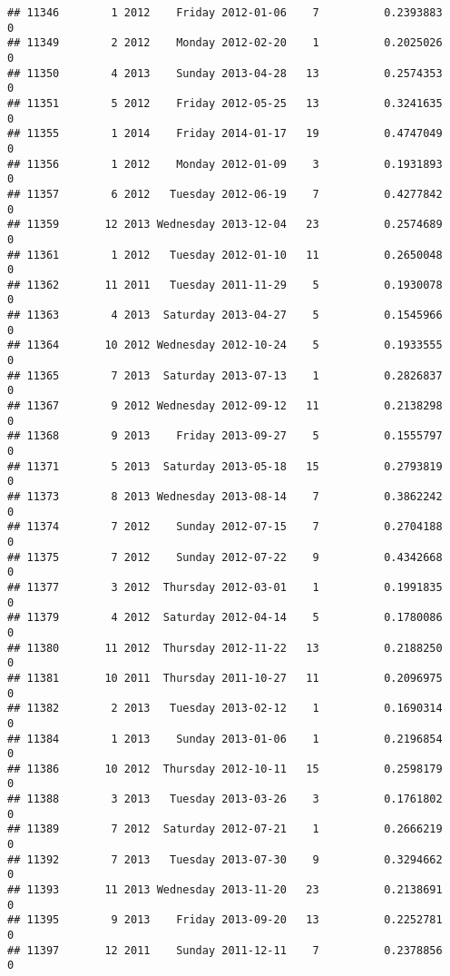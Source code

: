 \documentclass[
]{article}
\begin{document}
\begin{verbatim}
## 11346        1 2012    Friday 2012-01-06    7          0.2393883             0
## 11349        2 2012    Monday 2012-02-20    1          0.2025026             0
## 11350        4 2013    Sunday 2013-04-28   13          0.2574353             0
## 11351        5 2012    Friday 2012-05-25   13          0.3241635             0
## 11355        1 2014    Friday 2014-01-17   19          0.4747049             0
## 11356        1 2012    Monday 2012-01-09    3          0.1931893             0
## 11357        6 2012   Tuesday 2012-06-19    7          0.4277842             0
## 11359       12 2013 Wednesday 2013-12-04   23          0.2574689             0
## 11361        1 2012   Tuesday 2012-01-10   11          0.2650048             0
## 11362       11 2011   Tuesday 2011-11-29    5          0.1930078             0
## 11363        4 2013  Saturday 2013-04-27    5          0.1545966             0
## 11364       10 2012 Wednesday 2012-10-24    5          0.1933555             0
## 11365        7 2013  Saturday 2013-07-13    1          0.2826837             0
## 11367        9 2012 Wednesday 2012-09-12   11          0.2138298             0
## 11368        9 2013    Friday 2013-09-27    5          0.1555797             0
## 11371        5 2013  Saturday 2013-05-18   15          0.2793819             0
## 11373        8 2013 Wednesday 2013-08-14    7          0.3862242             0
## 11374        7 2012    Sunday 2012-07-15    7          0.2704188             0
## 11375        7 2012    Sunday 2012-07-22    9          0.4342668             0
## 11377        3 2012  Thursday 2012-03-01    1          0.1991835             0
## 11379        4 2012  Saturday 2012-04-14    5          0.1780086             0
## 11380       11 2012  Thursday 2012-11-22   13          0.2188250             0
## 11381       10 2011  Thursday 2011-10-27   11          0.2096975             0
## 11382        2 2013   Tuesday 2013-02-12    1          0.1690314             0
## 11384        1 2013    Sunday 2013-01-06    1          0.2196854             0
## 11386       10 2012  Thursday 2012-10-11   15          0.2598179             0
## 11388        3 2013   Tuesday 2013-03-26    3          0.1761802             0
## 11389        7 2012  Saturday 2012-07-21    1          0.2666219             0
## 11392        7 2013   Tuesday 2013-07-30    9          0.3294662             0
## 11393       11 2013 Wednesday 2013-11-20   23          0.2138691             0
## 11395        9 2013    Friday 2013-09-20   13          0.2252781             0
## 11397       12 2011    Sunday 2011-12-11    7          0.2378856             0

\end{verbatim}
\end{document}
